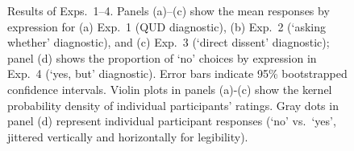 \documentclass[times,linguex,xcolor]{glossa}
\begin{document}
 
  \begin{figure}[h!]
    \centering
    \hfill


    \hfill
  \caption{Results of Exps.~1--4.
    Panels (a)--(c) show the mean responses by expression for (a) Exp.~1 (QUD diagnostic),  (b) Exp.~2 (`asking whether' diagnostic), and (c) Exp.~3 (`direct dissent' diagnostic); panel (d) shows the proportion of `no' choices by expression in Exp.~4 (`yes, but' diagnostic). Error bars indicate 95\% bootstrapped confidence intervals. Violin plots in panels (a)-(c) show the kernel probability density of individual participants' ratings. Gray dots in panel (d) represent individual participant responses (`no' vs.\ `yes', jittered vertically and horizontally for legibility).}
  \label{fig:results}
  \end{figure}
\end{document}
